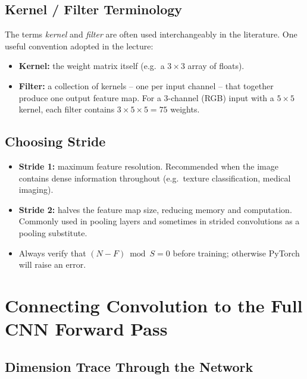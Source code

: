 \documentclass[12pt,a4paper]{article}
\begin{document}
\subsection{Kernel / Filter Terminology}
\label{subsec:terminology}

The terms \emph{kernel} and \emph{filter} are often used interchangeably in
the literature.  One useful convention adopted in the lecture:

\begin{itemize}[leftmargin=2em]
  \item \textbf{Kernel:} the weight matrix itself (e.g.\ a $3\times3$ array
        of floats).
  \item \textbf{Filter:} a collection of kernels -- one per input channel --
        that together produce one output feature map.  For a 3-channel (RGB)
        input with a $5\times5$ kernel, each filter contains
        $3 \times 5 \times 5 = 75$ weights.
\end{itemize}

\subsection{Choosing Stride}
\label{subsec:choosing_stride}

\begin{itemize}[leftmargin=2em]
  \item \textbf{Stride 1:} maximum feature resolution.  Recommended when
        the image contains dense information throughout (e.g.\ texture
        classification, medical imaging).
  \item \textbf{Stride 2:} halves the feature map size, reducing memory and
        computation.  Commonly used in pooling layers and sometimes in strided
        convolutions as a pooling substitute.
  \item Always verify that $(N - F) \bmod S = 0$ before training; otherwise
        PyTorch will raise an error.
\end{itemize}

\section{Connecting Convolution to the Full CNN Forward Pass}
\label{sec:forward_pass}

\subsection{Dimension Trace Through the Network}
\label{subsec:dim_trace}
\end{document}
